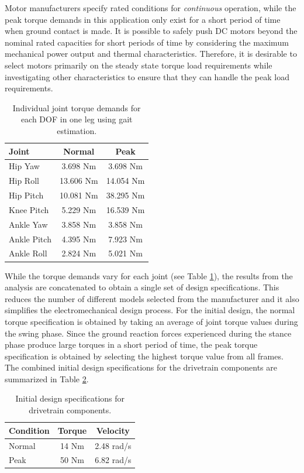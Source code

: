 Motor manufacturers specify rated conditions for \emph{continuous} operation, while the peak torque demands in this application only exist for a short period of time when ground contact is made. It is possible to safely push DC motors beyond the nominal rated capacities for short periods of time by considering the maximum mechanical power output and thermal characteristics. Therefore, it is desirable to select motors primarily on the steady state torque load requirements while investigating other characteristics to ensure that they can handle the peak load requirements. 

\begin{table}[!h]
  \centering
  \caption{Individual joint torque demands for each DOF in one leg using gait estimation.}
    \begin{tabular}{lcc}
    \addlinespace
    \toprule
    \textbf{Joint} & \textbf{Normal} & \textbf{Peak}\\
    \midrule
    Hip Yaw		&	3.698 Nm	&	3.698 Nm\\
    Hip Roll	&	13.606 Nm	&	14.054 Nm\\
    Hip Pitch	&	10.081 Nm	&	38.295 Nm\\
    Knee Pitch  &	5.229 Nm	&	16.539 Nm\\
    Ankle Yaw	&	3.858 Nm	&	3.858 Nm\\
    Ankle Pitch	&	4.395 Nm	&	7.923 Nm\\
    Ankle Roll	&	2.824 Nm	&	5.021 Nm\\
    \bottomrule
    \end{tabular}%
  \label{jointtable}%
\end{table}%

While the torque demands vary for each joint (see Table \ref{jointtable}), the results from the analysis are concatenated to obtain a single set of design specifications. This reduces the number of different models selected from the manufacturer and it also simplifies the electromechanical design process. For the initial design, the normal torque specification is obtained by taking an average of joint torque values during the swing phase. Since the ground reaction forces experienced during the stance phase produce large torques in a short period of time, the peak torque specification is obtained by selecting the highest torque value from all frames. The combined initial design specifications for the drivetrain components are summarized in Table \ref{tab:spectable}.

\begin{table}[!h]
  \centering
  \caption{Initial design specifications for drivetrain components.}
    \begin{tabular}{lcc}
    \addlinespace
    \toprule
    \textbf{Condition} & \textbf{Torque} & \textbf{Velocity}\\
    \midrule
    Normal & 14 Nm & 2.48 rad/s\\
    Peak  & 50 Nm & 6.82 rad/s \\
    \bottomrule
    \end{tabular}%
  \label{tab:spectable}%
\end{table}%

